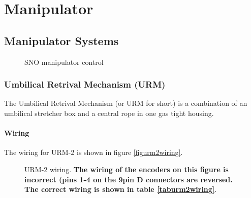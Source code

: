  
  



\chapter{Manipulator}

  
\section{Manipulator Systems}
  
 
\begin{figure}[htbp]
\begin{center}
\leavevmode
\epsfxsize=6in
\caption[SNO manipulator control hardware]{SNO manipulator control
  }
\end{center}
\end{figure}
  
  
\newpage
\subsection{Umbilical Retrival Mechanism (URM)}
The Umbilical Retrival Mechanism (or URM for short) is a combination
of an umbilical stretcher box and a central rope in one gas tight
housing.
 
\subsubsection{Wiring}
The wiring for URM-2 is shown in figure \ref{figurm2wiring}.
\begin{figure}[htbp]
\begin{center}
\leavevmode
\epsfxsize=12in
\caption[URM-2 wiring]{URM-2 wiring.  {\bf The wiring of the encoders
  on this figure is incorrect (pins 1-4 on the 9pin D connectors are
  reversed.  The correct wiring is shown in table \ref{taburm2wiring}}.
  }
\end{center}
\end{figure}

